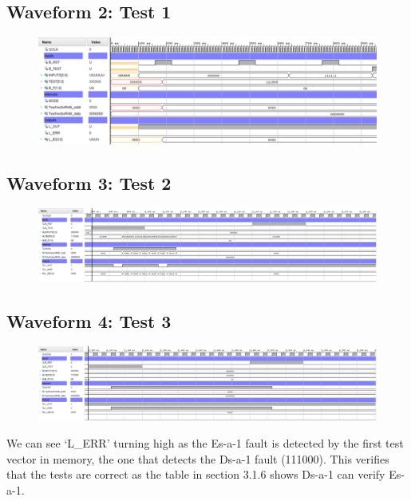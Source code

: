 \documentclass[11pt]{report}
\begin{document}
\subsection*{Waveform 2: Test 1}
\begin{figure}[H]
    \includegraphics[width=\columnwidth]{Reports/Lab4/Assets/3.2.3_test1.png}
\end{figure}

\subsection*{Waveform 3: Test 2}
\begin{figure}[H]
    \includegraphics[width=\columnwidth]{Reports/Lab4/Assets/3.2.3_test2.png}
\end{figure}

\subsection*{Waveform 4: Test 3}
\begin{figure}[H]
    \includegraphics[width=\columnwidth]{Reports/Lab4/Assets/3.2.3_test3.png}
\end{figure}

We can see `L\_ERR' turning high as the Es-a-1 fault is detected by the first test vector in memory, the one that detects the Ds-a-1 fault (111000). This verifies that the tests are correct as the table in section 3.1.6 shows Ds-a-1 can verify Es-a-1.
\end{document}
